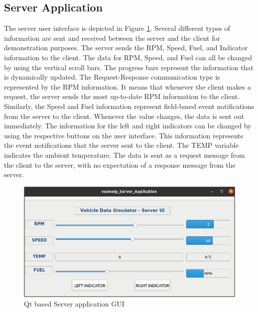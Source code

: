 \subsection{Server Application}



The server user interface is depicted in Figure \ref{fig:serverUI}. Several different types of information are sent and received between the server and the client for demonstration purposes. The server sends the RPM, Speed, Fuel, and Indicator information to the client. The data for RPM, Speed, and Fuel can all be changed by using the vertical scroll bars. The progress bars represent the information that is dynamically updated. The Request-Response communication type is represented by the RPM information. It means that whenever the client makes a request, the server sends the most up-to-date RPM information to the client. Similarly, the Speed and Fuel information represent field-based event notifications from the server to the client. Whenever the value changes, the data is sent out immediately. The information for the left and right indicators can be changed by using the respective buttons on the user interface. This information represents the event notifications that the server sent to the client. The TEMP variable indicates the ambient temperature. The data is sent as a request message from the client to the server, with no expectation of a response message from the server.

\begin{figure}[!htb]
	\centering
		\includegraphics[width=1\textwidth]{images/serverUI.png}
	\caption{Qt based Server application GUI}
	\label{fig:serverUI}
\end{figure}

